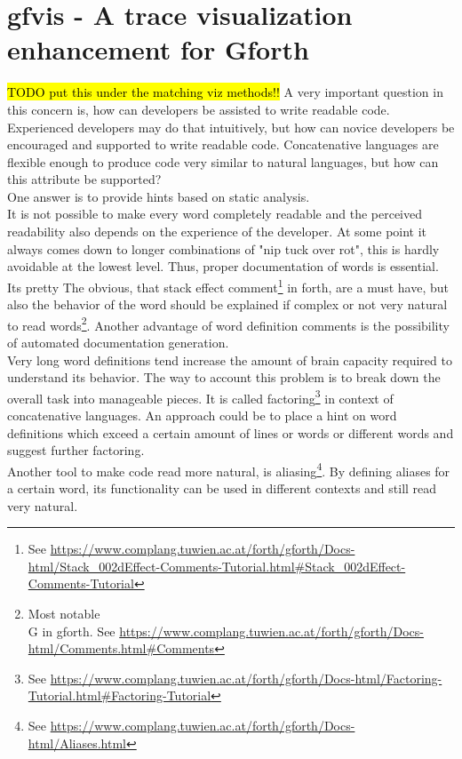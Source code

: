 \section{gfvis - A trace visualization enhancement for Gforth}

\hl{TODO put this under the matching viz methods!!}
A very important question in this concern is, how can developers be assisted to write readable code. Experienced developers may do that intuitively, but how can novice developers be encouraged and supported to write readable code. Concatenative languages are flexible enough to produce code very similar to natural languages, but how can this attribute be supported?\\
One answer is to provide hints based on static analysis.\\
It is not possible to make every word completely readable and the perceived readability also depends on the experience of the developer. At some point  it always comes down to longer combinations of "nip tuck over rot", this is hardly avoidable at the lowest level. Thus, proper documentation of words is essential. Its pretty The obvious, that stack effect comment\footnote{See \url{https://www.complang.tuwien.ac.at/forth/gforth/Docs-html/Stack\_002dEffect-Comments-Tutorial.html\#Stack\_002dEffect-Comments-Tutorial}} in forth, are a must have, but also the behavior of the word should be explained if complex or not very natural to read words\footnote{Most notable \\G in gforth. See \url{https://www.complang.tuwien.ac.at/forth/gforth/Docs-html/Comments.html\#Comments}}. Another advantage of word definition comments is the possibility of automated documentation generation.\\
Very long word definitions tend increase the amount of brain capacity required to understand its behavior. The way to account this problem is to break down the overall task into manageable pieces. It is called factoring\footnote{See \url{https://www.complang.tuwien.ac.at/forth/gforth/Docs-html/Factoring-Tutorial.html\#Factoring-Tutorial}} in context of concatenative languages. An approach could be to place a hint on word definitions which exceed a certain amount of lines or words or different words and suggest further factoring.\\
Another tool to make code read more natural, is aliasing\footnote{See \url{https://www.complang.tuwien.ac.at/forth/gforth/Docs-html/Aliases.html}}. By defining aliases for a certain word, its functionality can be used in different contexts and still read very natural.

